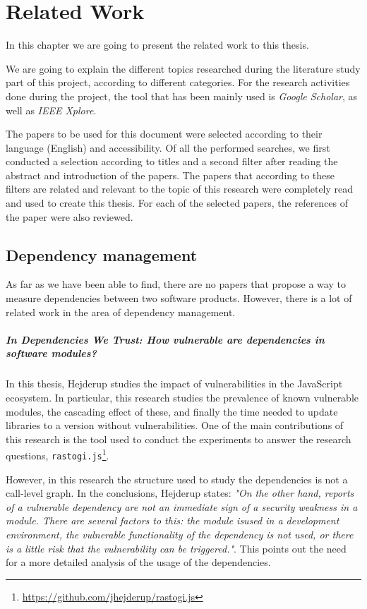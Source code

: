 \chapter{Related Work}\label{ch:RelatedWork}
In this chapter we are going to present the related work to this thesis.

We are going to explain the different topics researched during the literature study part of this project, according to different categories.
For the research activities done during the project, the tool that has been mainly used is \textit{Google Scholar}, as well as \textit{IEEE Xplore}.

\blankl
The papers to be used for this document were selected according to their language (English) and accessibility. Of all the performed searches, we first conducted a selection according to titles and a second filter after reading the abstract and introduction of the papers.
The papers that according to these filters are related and relevant to the topic of this research were completely read and used to create this thesis. For each of the selected papers, the references of the paper were also reviewed.

\section{Dependency management}

As far as we have been able to find, there are no papers that propose a way to measure dependencies between two software products. However, there is a lot of related work in the area of dependency management.

\paragraph{In Dependencies We Trust: How vulnerable are dependencies in software modules? \cite{hejderup2015dependencies}}
In this thesis, Hejderup studies the impact of vulnerabilities in the JavaScript ecosystem. In particular, this research studies the prevalence of known vulnerable modules, the cascading effect of these, and finally the time needed to update libraries to a version without vulnerabilities.
One of the main contributions of this research is the tool used to conduct the experiments to answer the research questions, \texttt{rastogi.js}\footnote{\href{https://github.com/jhejderup/rastogi.js}{https://github.com/jhejderup/rastogi.js}}.

However, in this research the structure used to study the dependencies is not a call-level graph. In the conclusions, Hejderup states: \textit{"On the other hand, reports of a vulnerable dependency are not an immediate sign of a security weakness in a module. There are several factors to this: the module isused in a development environment, the vulnerable functionality of the dependency is not used, or there is a little risk that the vulnerability can be triggered."}. This points out the need for a more detailed analysis of the usage of the dependencies.

